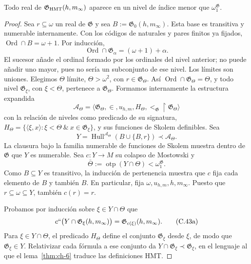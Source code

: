 \begin{lemma}
\label{thm:ch-8}
Todo real de
\(\mathfrak G_{\rm HMT}(h,m_\infty)\) aparece en un nivel de índice menor que
\(\omega_1^{\mathfrak G}\).

\end{lemma}
\begin{proof}
Sea \(r\subseteq\omega\) un real de \(\mathfrak G\) y sea
\(B:=\mathfrak G_0(h,m_\infty)\). Esta base es transitiva y numerable
internamente. Con los códigos de naturales y pares finitos ya fijados,
\(\operatorname{Ord}\cap B=\omega+1\). Por inducción,
\[
 \operatorname{Ord}\cap\mathfrak G_\alpha=(\omega+1)+\alpha.
\]
El sucesor añade el ordinal formado por los ordinales del nivel anterior;
no puede añadir uno mayor, pues no sería un subconjunto de ese nivel. Los
límites son uniones. Elegimos \(\Theta\) límite, \(\Theta>\omega^2\),
con \(r\in\mathfrak G_\Theta\). Así
\(\operatorname{Ord}\cap\mathfrak G_\Theta=\Theta\), y todo nivel
\(\mathfrak G_\xi\), con \(\xi<\Theta\), pertenece a
\(\mathfrak G_\Theta\). Formamos internamente la estructura expandida
\[
 \mathcal A_\Theta=
 \langle\mathfrak G_\Theta,\in,u_{h,m},
         H_\Theta,<_{\mathfrak G}\!\upharpoonright\mathfrak G_\Theta\rangle
\]
con la relación de niveles como predicado de su signatura,
\(H_\Theta=\{\langle\xi,x\rangle:\xi<\Theta\ \&\
x\in\mathfrak G_\xi\}\), y sus funciones de Skolem definibles. Sea
\[
 Y=\operatorname{Hull}^{\mathcal A_\Theta}
   (B\cup\{B,r\})\prec\mathcal A_\Theta .
\]
La clausura bajo la familia numerable de funciones de Skolem muestra dentro
de \(\mathfrak G\) que \(Y\) es numerable. Sea
\(c:Y\rightarrow M\) su colapso de Mostowski y
\[
 \bar\Theta:=\operatorname{otp}(Y\cap\Theta)
 <\omega_1^{\mathfrak G}.
\]
Como \(B\subseteq Y\) es transitivo, la inducción de pertenencia muestra
que \(c\) fija cada elemento de \(B\) y también \(B\). En particular,
fija \(\omega,u_{h,m},h,m_\infty\). Puesto que
\(r\subseteq\omega\subseteq Y\), también \(c(r)=r\).

Probamos por inducción sobre \(\xi\in Y\cap\Theta\) que
\[
 c``\bigl(Y\cap\mathfrak G_\xi(h,m_\infty)\bigr)
 =\mathfrak G_{c(\xi)}(h,m_\infty).
\tag{C.43a}\label{eq:ch-condensacion}
\]
Para \(\xi\in Y\cap\Theta\), el predicado \(H_\Theta\) define el
conjunto \(\mathfrak G_\xi\) desde \(\xi\), de modo que
\(\mathfrak G_\xi\in Y\). Relativizar cada fórmula a ese conjunto da
\(Y\cap\mathfrak G_\xi\prec\mathfrak G_\xi\), en el lenguaje al que
el lema~\ref{thm:ch-6} traduce las definiciones HMT.


\end{proof}

